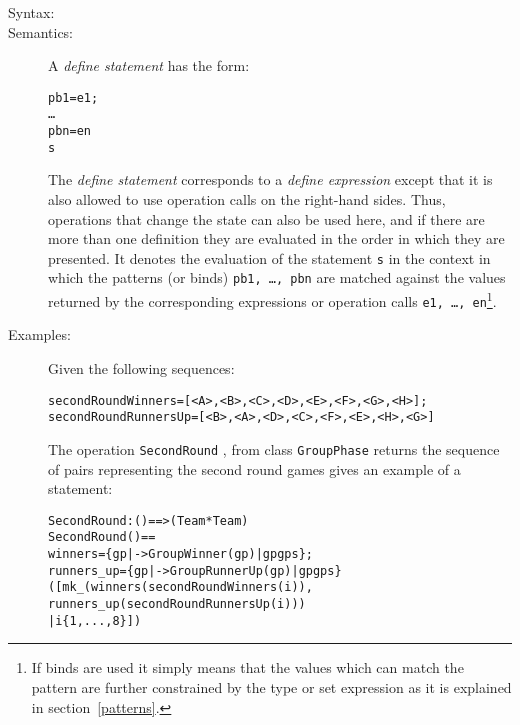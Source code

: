 \documentclass[\pformat,12pt]{article}
\begin{document}
\begin{description}
\item[Syntax:]



\item[Semantics:] A {\it define statement} has the form:
  \begin{alltt}
     pb1 = e1;
        \ldots
        pbn = en
      s
  \end{alltt}
  The {\it define statement} corresponds to a {\it define expression}
  except that it is also allowed to use operation calls on the right-hand
  sides. Thus, operations that change the state can also be used here, and
  if there are more than one definition they are evaluated in the order in
  which they are presented.  It denotes the evaluation of the statement
  {\tt s} in the context in which the patterns (or binds) {\tt pb1, \ldots,
    pbn} are matched against the values returned by the corresponding
  expressions or operation calls {\tt e1, \ldots, en}\footnote{If binds are
    used it simply means that the values which can match the pattern are
    further constrained by the type or set expression as it is explained in
    section~\ref{patterns}.}.

\item[Examples:] Given the following sequences:
  \begin{alltt}
  secondRoundWinners = [<A>,<B>,<C>,<D>,<E>,<F>,<G>,<H>];
  secondRoundRunnersUp = [<B>,<A>,<D>,<C>,<F>,<E>,<H>,<G>]
  \end{alltt}
  The operation \texttt{SecondRound}%
, from class \texttt{GroupPhase}
  returns the sequence of pairs 
  representing the second round games gives an example of a  
  statement:
  \begin{alltt}
  SecondRound : () ==>  (Team * Team)
  SecondRound () ==
   winners = \{ gp |-> GroupWinner(gp) | gp  gps \};
     runners_up = \{ gp |-> GroupRunnerUp(gp) | gp  gps\}
   ([mk_(winners(secondRoundWinners(i)),
                runners_up(secondRoundRunnersUp(i))) 
           | i  \{1,...,8\}])
  \end{alltt}

\end{description}
\end{document}
